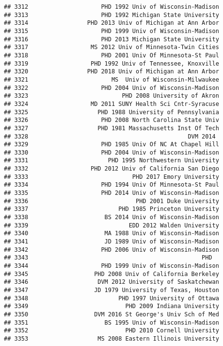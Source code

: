 \documentclass[
]{article}
\begin{document}
\begin{verbatim}
## 3312                     PHD 1992 Univ of Wisconsin-Madison
## 3313                     PHD 1992 Michigan State University
## 3314                 PHD 2013 Univ of Michigan at Ann Arbor
## 3315                     PHD 1999 Univ of Wisconsin-Madison
## 3316                     PHD 2013 Michigan State University
## 3317                  MS 2012 Univ of Minnesota-Twin Cities
## 3318                     PHD 2001 Univ Of Minnesota-St Paul
## 3319                  PHD 1992 Univ of Tennessee, Knoxville
## 3320                 PHD 2018 Univ of Michigan at Ann Arbor
## 3321                        MS  Univ of Wisconsin-Milwaukee
## 3322                     PHD 2004 Univ of Wisconsin-Madison
## 3323                           PHD 2008 University of Akron
## 3324                  MD 2011 SUNY Health Sci Cntr-Syracuse
## 3325                    PHD 1988 University of Pennsylvania
## 3326                     PHD 2008 North Carolina State Univ
## 3327                    PHD 1981 Massachusetts Inst Of Tech
## 3328                                              DVM 2014 
## 3329                     PHD 1985 Univ Of NC At Chapel Hill
## 3330                     PHD 2004 Univ of Wisconsin-Madison
## 3331                       PHD 1995 Northwestern University
## 3332                  PHD 2012 Univ of California San Diego
## 3333                              PHD 2017 Emory University
## 3334                     PHD 1994 Univ Of Minnesota-St Paul
## 3335                     PHD 2014 Univ of Wisconsin-Madison
## 3336                               PHD 2001 Duke University
## 3337                          PHD 1985 Princeton University
## 3338                      BS 2014 Univ of Wisconsin-Madison
## 3339                             EDD 2012 Walden University
## 3340                      MA 1988 Univ of Wisconsin-Madison
## 3341                      JD 1989 Univ of Wisconsin-Madison
## 3342                     PHD 2006 Univ of Wisconsin-Madison
## 3343                                                  PHD  
## 3344                     PHD 1999 Univ of Wisconsin-Madison
## 3345                   PHD 2008 Univ of California Berkeley
## 3346                    DVM 2012 University of Saskatchewan
## 3347                   JD 1979 University of Texas, Houston
## 3348                          PHD 1997 University of Ottawa
## 3349                            PHD 2009 Indiana University
## 3350                   DVM 2016 St George's Univ Sch of Med
## 3351                      BS 1995 Univ of Wisconsin-Madison
## 3352                            PHD 2010 Cornell University
## 3353                    MS 2008 Eastern Illinois University

\end{verbatim}
\end{document}
